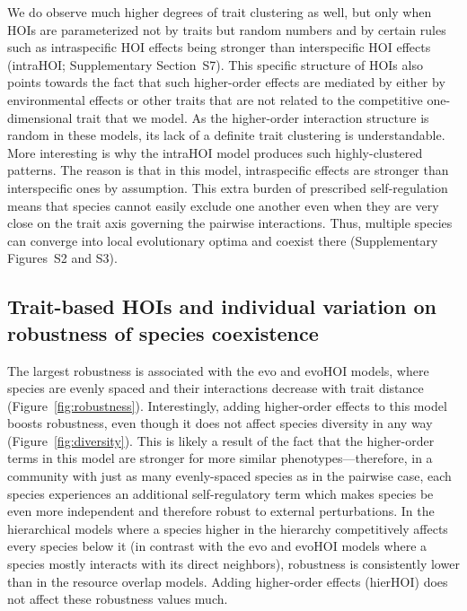 \documentclass[11pt]{article}
\newcommand{\SI}{Supplementary}
\begin{document}
We do observe much higher degrees of trait clustering as well, but only when HOIs are parameterized not by traits but random numbers and by certain rules such as intraspecific HOI effects being stronger than interspecific HOI effects (intraHOI; \SI{} Section~S7). This specific structure of HOIs also points towards the fact that such higher-order effects are mediated by either by environmental effects or other traits that are not related to the competitive one-dimensional trait that we model. As the higher-order interaction structure is random in these models, its lack of a definite trait clustering is understandable. More interesting is why the intraHOI model produces such highly-clustered patterns. The reason is that in this model, intraspecific effects are stronger than interspecific ones by assumption. This extra burden of prescribed self-regulation means that species cannot easily exclude one another even when they are very close on the trait axis governing the pairwise interactions. Thus, multiple species can converge into local evolutionary optima and coexist there (\SI{} Figures~S2 and S3).


\subsection{Trait-based HOIs and individual variation on robustness of species coexistence} \label{sec:rob-results}

The largest robustness is associated with the evo and evoHOI models, where species are evenly spaced and their interactions decrease with trait distance (Figure~\ref{fig:robustness}). Interestingly, adding higher-order effects to this model boosts robustness, even though it does not affect species diversity in any way (Figure~\ref{fig:diversity}). This is likely a result of the fact that the higher-order terms in this model are stronger for more similar phenotypes---therefore, in a community with just as many evenly-spaced species as in the pairwise case, each species experiences an additional self-regulatory term which makes species be even more independent and therefore robust to external perturbations. In the hierarchical models where a species higher in the hierarchy competitively affects every species below it (in contrast with the evo and evoHOI models where a species mostly interacts with its direct neighbors), robustness is consistently lower than in the resource overlap models. Adding higher-order effects (hierHOI) does not affect these robustness values much.
\end{document}
